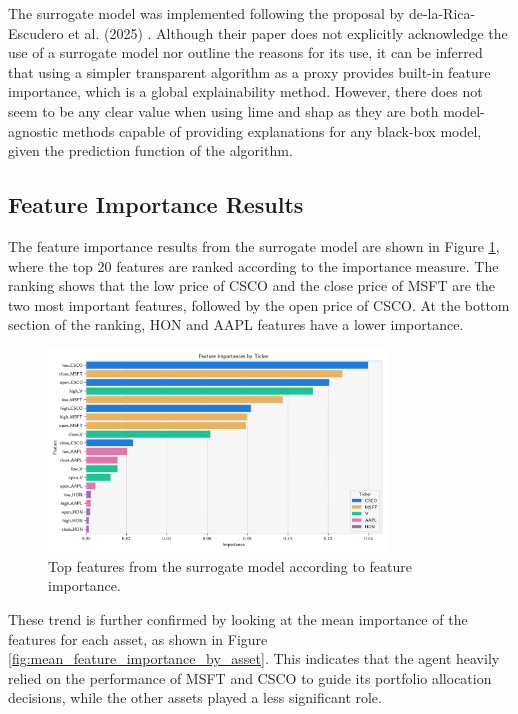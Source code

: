 The surrogate model was implemented following the proposal by de-la-Rica-Escudero et al. (2025) \cite{de-La-Rica-Escudero2025}. Although their paper does not explicitly acknowledge the use of a surrogate model nor outline the reasons for its use, it can be inferred that using a simpler transparent algorithm as a proxy provides built-in feature importance, which is a global explainability method. However, there does not seem to be any clear value when using \acrshort{lime} and \acrshort{shap} as they are both model-agnostic methods capable of providing explanations for any black-box model, given the prediction function of the algorithm. 

\subsection{Feature Importance Results} \label{sec:feature-importance-results}

The feature importance results from the surrogate model are shown in Figure \ref{fig:feature_importance_top_features}, where the top 20 features are ranked according to the importance measure. The ranking shows that the low price of CSCO and the close price of MSFT are the two most important features, followed by the open price of CSCO. At the bottom section of the ranking, HON and AAPL features have a lower importance.

\begin{figure}
    \centering
    \includegraphics[width=0.8\textwidth]{figures/feature_importance_top_features.png}
    \caption{Top features from the surrogate model according to feature importance.}
    \label{fig:feature_importance_top_features}
\end{figure}

These trend is further confirmed by looking at the mean importance of the features for each asset, as shown in Figure \ref{fig:mean_feature_importance_by_asset}. This indicates that the agent heavily relied on the performance of MSFT and CSCO to guide its portfolio allocation decisions, while the other assets played a less significant role. 

